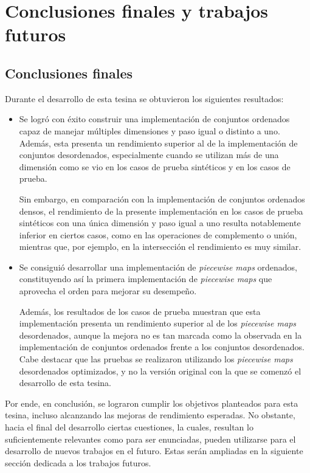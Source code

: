 \chapter{Conclusiones finales y trabajos futuros}

\section*{Conclusiones finales}

Durante el desarrollo de esta tesina se obtuvieron los siguientes resultados:
\begin{itemize}
    \item Se logró con éxito construir una implementación de conjuntos ordenados capaz de manejar múltiples dimensiones y paso igual o distinto a uno.  
    Además, esta presenta un rendimiento superior al de la implementación de conjuntos desordenados, especialmente cuando se utilizan más de una dimensión como se vio en los casos de prueba sintéticos y en los casos de prueba.  
    
    Sin embargo, en comparación con la implementación de conjuntos ordenados densos, el rendimiento de la presente implementación en los casos de prueba sintéticos con una única dimensión y paso igual a uno resulta notablemente inferior en ciertos casos, como en las operaciones de complemento o unión, mientras que, por ejemplo, en la intersección el rendimiento es muy similar.

    \item Se consiguió desarrollar una implementación de \textit{piecewise maps} ordenados, 
    constituyendo así la primera implementación de \textit{piecewise maps} que aprovecha el orden 
    para mejorar su desempeño.  
    
    Además, los resultados de los casos de prueba muestran que esta implementación presenta 
    un rendimiento superior al de los \textit{piecewise maps} desordenados, 
    aunque la mejora no es tan marcada como la observada en la implementación de conjuntos ordenados 
    frente a los conjuntos desordenados.  
    Cabe destacar que las pruebas se realizaron utilizando los
    \textit{piecewise maps} desordenados optimizados, y no la versión original con la que se comenzó el desarrollo de esta tesina.
\end{itemize}

Por ende, en conclusión, se lograron cumplir los objetivos planteados para esta tesina, 
incluso alcanzando las mejoras de rendimiento esperadas.  
No obstante, hacia el final del desarrollo ciertas cuestiones, la cuales, resultan lo suficientemente relevantes como para ser enunciadas, pueden utilizarse para el desarrollo de nuevos trabajos en el futuro.  
Estas serán ampliadas en la siguiente sección dedicada a los trabajos futuros.

